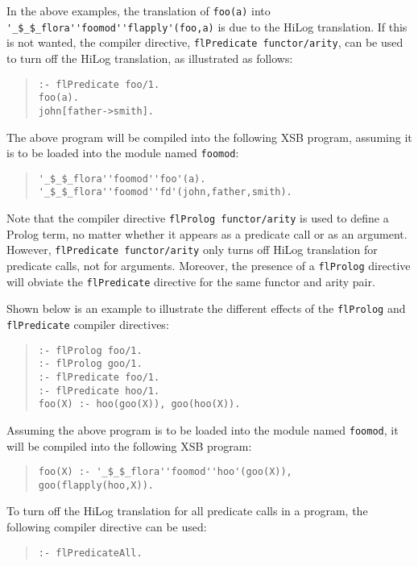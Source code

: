 \documentclass[11pt]{article}
\begin{document}
%
In the above examples, the translation of {\tt foo(a)} into
\verb|'_$_$_flora''foomod''flapply'(foo,a)| is due to the HiLog
translation. If this is not wanted, the compiler directive,
{\tt flPredicate functor/arity}, can be used to turn off the HiLog
translation, as illustrated as follows:
\begin{quote}
\begin{verbatim}
:- flPredicate foo/1.
foo(a).
john[father->smith].
\end{verbatim}
\end{quote}
The above program will be compiled into the following XSB program,
assuming it is to be loaded into the module named {\tt foomod}:
\begin{quote}
\begin{verbatim}
'_$_$_flora''foomod''foo'(a).
'_$_$_flora''foomod''fd'(john,father,smith).
\end{verbatim}
\end{quote}

Note that the compiler directive \mbox{\tt flProlog functor/arity} is used
to define a Prolog term, no matter whether it appears as
a predicate call or as an argument. However, \mbox{\tt flPredicate functor/arity}
only turns off HiLog translation for predicate calls, not for arguments.
Moreover, the presence of a {\tt flProlog} directive will obviate
the {\tt flPredicate} directive for the same functor and arity pair. 

Shown below is an example to illustrate the different effects of the
{\tt flProlog} and {\tt flPredicate} compiler directives:
\begin{quote}
\begin{verbatim}
:- flProlog foo/1.
:- flProlog goo/1.
:- flPredicate foo/1.
:- flPredicate hoo/1.
foo(X) :- hoo(goo(X)), goo(hoo(X)).
\end{verbatim}
\end{quote}
Assuming the above program is to be loaded into the module named
{\tt foomod}, it will be compiled into the following XSB program:
\begin{quote}
\begin{verbatim}
foo(X) :- '_$_$_flora''foomod''hoo'(goo(X)), goo(flapply(hoo,X)).
\end{verbatim}
\end{quote}

%
To turn off the HiLog translation for all predicate calls in a program,
the following compiler directive can be used:
\begin{quote}
\begin{verbatim}
:- flPredicateAll.
\end{verbatim}
\end{quote}
\end{document}
